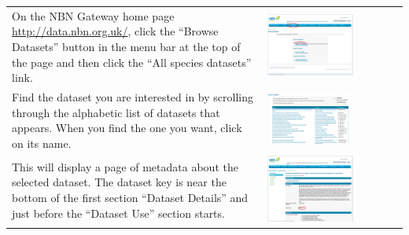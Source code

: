 \documentclass{article}
\begin{document}
\begin{enumerate}
\begin{tabular}{ m{} m{} }
  \item On the NBN Gateway home page \url{http://data.nbn.org.uk/}, click the
  ``Browse Datasets'' button in the menu bar at the top of the page and then
  click the ``All species datasets'' link.
  &
  \includegraphics[width=0.66\textwidth]{NBN_datasets.png}
  \\
  \item Find the dataset you are interested in by scrolling through the 
  alphabetic list of datasets that appears. When you find the one you want,
  click on its name.
  &
  \includegraphics[width=0.66\textwidth]{NBN_datasets_list.png}
  \\
  \item This will display a page of metadata about the selected dataset. The
  dataset key is near the bottom of the first section ``Dataset Details''
  and just before the ``Dataset Use'' section starts.
  &
  \includegraphics[width=0.66\textwidth]{NBN_dataset_details.png}
  \\
\end{tabular}
\end{enumerate}
\end{document}
